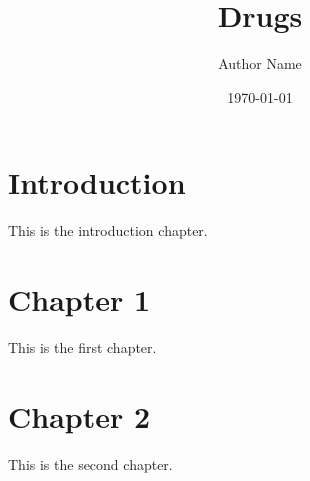 \documentclass{book}
\title{Drugs}
\author{Author Name}
\date{\today}
\begin{document}
\maketitle

\tableofcontents

\chapter{Introduction}
This is the introduction chapter.

\chapter{Chapter 1}
This is the first chapter.

\chapter{Chapter 2}
This is the second chapter.
\end{document}

